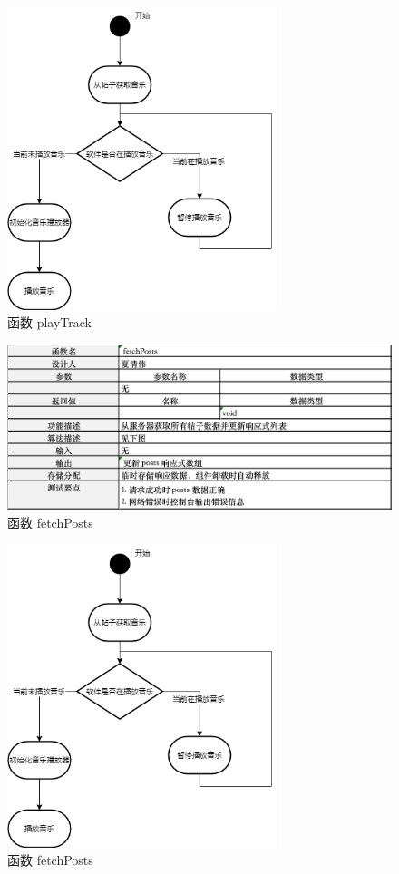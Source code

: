 \documentclass{base}
\numberwithin{figure}{section} %
\begin{document}
\begin{figure}[H]
    \centering
    \includegraphics[width=0.7\textwidth]{images/class-activity-1.png}
    \caption{函数 playTrack}
\end{figure}

\begin{figure}[H]
    \centering
    \includegraphics[width=\textwidth]{images/class-table-2.png}
    \caption{函数 fetchPosts}
\end{figure}

\begin{figure}[H]
    \centering
    \includegraphics[width=0.7\textwidth]{images/class-activity-1.png}
    \caption{函数 fetchPosts}
\end{figure}
\end{document}
